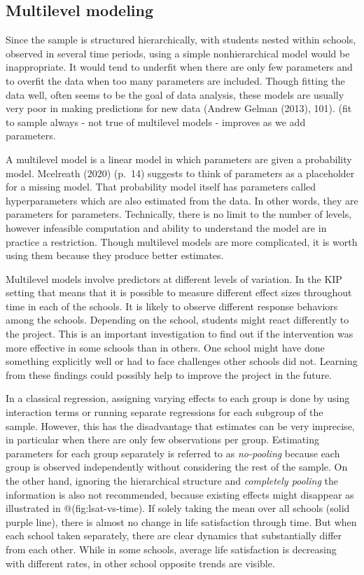 \documentclass[a4, 12pt]{article}
\begin{document}
\hypertarget{multilevel-modeling}{%
\subsection{Multilevel modeling}\label{multilevel-modeling}}

Since the sample is structured hierarchically, with students nested within schools, observed in several time periods, using a simple nonhierarchical model would be inappropriate. It would tend to underfit when there are only few parameters and to overfit the data when too many parameters are included. Though fitting the data well, often seems to be the goal of data analysis, these models are usually very poor in making predictions for new data (Andrew Gelman (2013), 101). (fit to sample always - not true of multilevel models - improves as we add parameters.

A multilevel model is a linear model in which parameters are given a probability model. Mcelreath (2020) (p.~14) suggests to think of parameters as a placeholder for a missing model. That probability model itself has parameters called hyperparameters which are also estimated from the data. In other words, they are parameters for parameters. Technically, there is no limit to the number of levels, however infeasible computation and ability to understand the model are in practice a restriction. Though multilevel models are more complicated, it is worth using them because they produce better estimates.

Multilevel models involve predictors at different levels of variation. In the KIP setting that means that it is possible to measure different effect sizes throughout time in each of the schools. It is likely to observe different response behaviors among the schools. Depending on the school, students might react differently to the project. This is an important investigation to find out if the intervention was more effective in some schools than in others. One school might have done something explicitly well or had to face challenges other schools did not. Learning from these findings could possibly help to improve the project in the future.

In a classical regression, assigning varying effects to each group is done by using interaction terms or running separate regressions for each subgroup of the sample. However, this has the disadvantage that estimates can be very imprecise, in particular when there are only few observations per group. Estimating parameters for each group separately is referred to as \emph{no-pooling} because each group is observed independently without considering the rest of the sample. On the other hand, ignoring the hierarchical structure and \emph{completely pooling} the information is also not recommended, because existing effects might disappear as illustrated in @(fig:lsat-vs-time). If solely taking the mean over all schools (solid purple line), there is almost no change in life satisfaction through time. But when each school taken separately, there are clear dynamics that substantially differ from each other. While in some schools, average life satisfaction is decreasing with different rates, in other school opposite trends are visible.
\end{document}
